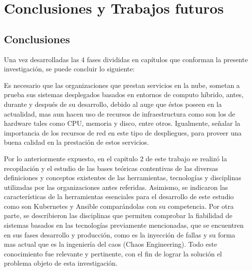\chapter{Conclusiones y Trabajos futuros}

\section{Conclusiones}

\par Una vez desarrolladas las 4 fases divididas en capítulos que conforman la presente investigación, se puede concluir lo siguiente:\\
\par Es necesario que las organizaciones que prestan servicios en la nube, sometan a prueba sus sistemas desplegados basados en entornos de computo híbrido, antes, durante y después de su desarrollo, debido al auge que \'estos poseen en la actualidad, mas aun hacen uso de recursos de infraestructura como son los de hardware tales como CPU, memoria y disco, entre otros. Igualmente, señalar la importancia de los recursos de red en este tipo de despliegues, para proveer una buena calidad en la prestación de estos servicios. \\

\par Por lo anteriormente expuesto, en el capitulo 2 de este trabajo se realiz\'o la recopilación y el estudio de las bases teóricas contentivas de las diversas definiciones y conceptos existentes de las herramientas, tecnologías y disciplinas utilizadas por las organizaciones antes referidas. Asimismo, se indicaron las características de la herramientas esenciales para el desarrollo de este estudio como son Kubernetes y Ansible comparándolas con su competencia. Por otra parte, se describieron las disciplinas que permiten comprobar la fiabilidad de sistemas basados en las tecnologías previamente mencionadas, que se encuentren en sus fases desarrollo y producción, como es la inyección de fallas y su forma mas actual que es la ingeniería del caos (Chaos Engineering). Todo este conocimiento fue relevante y pertinente, con el fin de lograr la solución el problema objeto de esta investigación. \\

